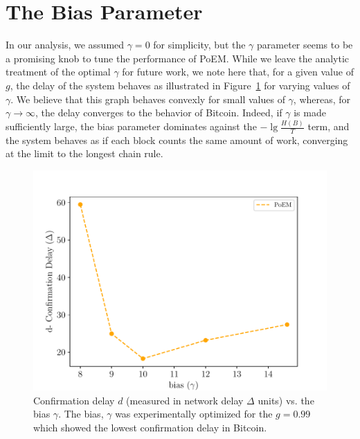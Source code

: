 \section{The Bias Parameter}

In our analysis, we assumed $\gamma = 0$ for simplicity, but the $\gamma$ parameter
seems to be a promising knob to tune the performance of PoEM. While we leave the
analytic treatment of the optimal $\gamma$ for future work, we note here that,
for a given value of $g$, the delay of the system behaves as illustrated in Figure~\ref{fig:bias}
for varying values of $\gamma$. We believe that this graph behaves convexly for
small values of $\gamma$, whereas, for $\gamma \to \infty$, the delay converges to
the behavior of Bitcoin. Indeed, if $\gamma$ is made sufficiently large, the bias
parameter dominates against the $-\lg\frac{H(B)}{T}$ term, and the system behaves
as if each block counts the same amount of work, converging at the limit to the
longest chain rule.

\begin{figure}[h]
    \centering
    \includegraphics[width=\columnwidth,keepaspectratio]{figures/gamma.pdf}
    \caption{Confirmation delay $d$ (measured in network delay $\Delta$ units) vs. the bias $\gamma$. The bias, $\gamma$ was experimentally optimized for the $g = 0.99$ which showed the lowest confirmation delay in Bitcoin.
    }
    \label{fig:bias}
\end{figure}